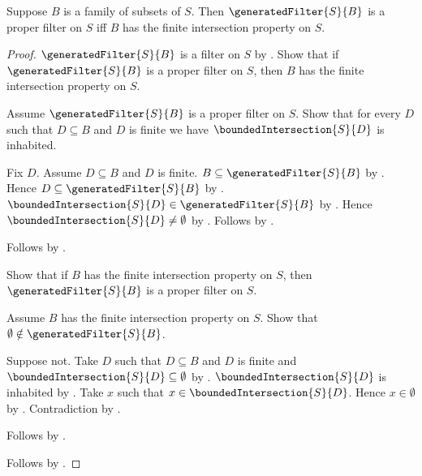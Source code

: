 \begin{theorem}\label{generated_filter_is_proper_iff_hosted_fip}
    Suppose $B$ is a family of subsets of $S$.
    Then $\generatedFilter{S}{B}$ is a proper filter on $S$ iff
        $B$ has the finite intersection property on $S$.
\end{theorem}
\begin{proof}
    $\generatedFilter{S}{B}$ is a filter on $S$ by
        .
    Show that if $\generatedFilter{S}{B}$ is a proper filter on $S$, then
        $B$ has the finite intersection property on $S$.
    \begin{subproof}
        Assume $\generatedFilter{S}{B}$ is a proper filter on $S$.
        Show that for every $D$ such that $D\subseteq B$ and $D$ is finite
            we have $\boundedIntersection{S}{D}$ is inhabited.
        \begin{subproof}
            Fix $D$.
            Assume $D\subseteq B$ and $D$ is finite.
            $B\subseteq\generatedFilter{S}{B}$ by
                .
            Hence $D\subseteq\generatedFilter{S}{B}$ by
                .
            $\boundedIntersection{S}{D}\in\generatedFilter{S}{B}$ by
                .
            Hence $\boundedIntersection{S}{D}\neq\emptyset$ by
                .
            Follows by .
        \end{subproof}
        Follows by .
    \end{subproof}

    Show that if $B$ has the finite intersection property on $S$, then
        $\generatedFilter{S}{B}$ is a proper filter on $S$.
    \begin{subproof}
        Assume $B$ has the finite intersection property on $S$.
        Show that $\emptyset\notin\generatedFilter{S}{B}$.
        \begin{subproof}
            Suppose not.
            Take $D$ such that $D\subseteq B$ and $D$ is finite and
                $\boundedIntersection{S}{D}\subseteq\emptyset$
                by .
            $\boundedIntersection{S}{D}$ is inhabited by
                .
            Take $x$ such that $x\in\boundedIntersection{S}{D}$.
            Hence $x\in\emptyset$ by .
            Contradiction by .
        \end{subproof}
        Follows by .
    \end{subproof}
    Follows by \auto.
\end{proof}

